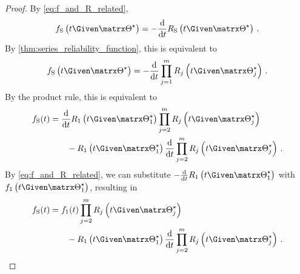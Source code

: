 \documentclass[../main.tex]{subfiles}
\begin{document}
\begin{proof}
By \cref{eq:f_and_R_related},
\begin{equation}
    \spdf\left(t \Given \tparam\sysparam\right) = -\derivative{t} \srv_{\sv}\left(t \Given \tparam\sysparam\right)\,.
\end{equation}
By \cref{thm:series_reliability_function}, this is equivalent to
\begin{equation}
    \spdf\left(t \Given \tparam\sysparam\right) = -\derivative{t} \prod_{j=1}^{m} \srv_j\left(t \Given \tparam{\sysparam}_j\right)\,.
\end{equation}
By the product rule, this is equivalent to
\begin{equation}
\begin{split}
    \spdf(t) &= \derivative{t} \srv_1\left(t\Given \tparam{\sysparam}_1\right) \prod_{j=2}^{m} \srv_j\left(t \Given \tparam{\sysparam}_j\right)\\
    & \qquad - \srv_1\left(t \Given \tparam{\sysparam}_1\right) \derivative{t} \prod_{j=2}^{m} \srv_j\left(t \Given \tparam{\sysparam}_j\right)\,.
\end{split}
\end{equation}
By \cref{eq:f_and_R_related}, we can substitute $-\derivative{t} \srv_1\left(t \Given \tparam{\sysparam}_1\right)$ with $\pdf_1\left(t \Given \tparam{\sysparam}_1\right)$, resulting in
\begin{equation}
\begin{split}
    \spdf(t) &= \pdf_1(t) \prod_{j=2}^{m} \srv_j\left(t \Given \tparam{\sysparam}_j\right)\\
    & \qquad - \srv_1\left(t \Given \tparam{\sysparam}_1\right) \derivative{t} \prod_{j=2}^{m} \srv_j\left(t \Given \tparam{\sysparam}_j\right)\,.
\end{split}
\end{equation}


\end{proof}
\end{document}

